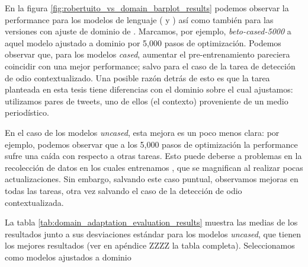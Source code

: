 En la figura \ref{fig:robertuito_vs_domain_barplot_results} podemos observar la performance para los modelos de lenguaje (\beto{} y \robertuito{}) así como también para las versiones con ajuste de dominio de \beto{}. Marcamos, por ejemplo, \emph{beto-cased-5000} a aquel modelo \beto{} ajustado a dominio por 5,000 pasos de optimización. Podemos observar que, para los modelos \emph{cased}, aumentar el pre-entrenamiento pareciera coincidir con una mejor performance; salvo para el caso de la tarea de detección de odio contextualizado. Una posible razón detrás de esto es que la tarea planteada en esta tesis tiene diferencias con el dominio sobre el cual ajustamos: utilizamos pares de tweets, uno de ellos (el contexto) proveniente de un medio periodístico.

En el caso de los modelos \emph{uncased}, esta mejora es un poco menos clara: por ejemplo, podemos observar que a los 5,000 pasos de optimización la performance sufre una caída con respecto a otras tareas. Esto puede deberse a problemas en la recolección de datos en los cuales entrenamos \robertuito{}, que se magnifican al realizar pocas actualizaciones. Sin embargo, salvando este caso puntual, observamos mejoras en todas las tareas, otra vez salvando el caso de la detección de odio contextualizada.

La tabla \ref{tab:domain_adaptation_evaluation_results} muestra las medias de los resultados junto a sus desviaciones estándar para los modelos \emph{uncased}, que tienen los mejores resultados (ver en apéndice ZZZZ la tabla completa). Seleccionamos como modelos ajustados a dominio



